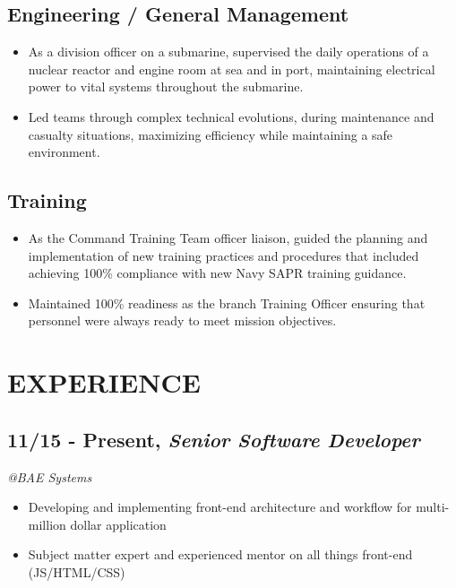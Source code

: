 \documentclass[10pt]{article}
\begin{document}
\subsection{Engineering / General
Management}\label{engineering-general-management}

\begin{itemize}
\itemsep1pt\parskip0pt
\item
  As a division officer on a submarine, supervised the daily operations
  of a nuclear reactor and engine room at sea and in port, maintaining
  electrical power to vital systems throughout the submarine.
\item
  Led teams through complex technical evolutions, during maintenance and
  casualty situations, maximizing efficiency while maintaining a safe
  environment.
\end{itemize}

\subsection{Training}\label{training}

\begin{itemize}
\itemsep1pt\parskip0pt
\item
  As the Command Training Team officer liaison, guided the planning and
  implementation of new training practices and procedures that included
  achieving 100\% compliance with new Navy SAPR training guidance.
\item
  Maintained 100\% readiness as the branch Training Officer ensuring
  that personnel were always ready to meet mission objectives.
\end{itemize}

\section{EXPERIENCE}\label{experience}

\subsection{11/15 - Present, \textbf{\emph{Senior Software
Developer}}}\label{present-senior-software-developer}

\emph{@BAE Systems }

\begin{itemize}
\itemsep1pt\parskip0pt
\item
  Developing and implementing front-end architecture and workflow for
  multi-million dollar application
\item
  Subject matter expert and experienced mentor on all things front-end
  (JS/HTML/CSS)
\end{itemize}
\end{document}
